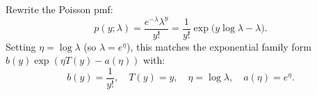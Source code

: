 \begin{answer}
Rewrite the Poisson pmf:
\[
p(y;\lambda) = \frac{e^{-\lambda}\lambda^y}{y!}
= \frac{1}{y!}\exp\!\bigl(y\log\lambda - \lambda\bigr).
\]
Setting $\eta = \log\lambda$ (so $\lambda = e^\eta$), this matches the exponential family form $b(y)\exp(\eta T(y) - a(\eta))$ with:
\[
b(y) = \frac{1}{y!}, \quad T(y) = y, \quad \eta = \log\lambda, \quad a(\eta) = e^\eta.
\]
\end{answer}
